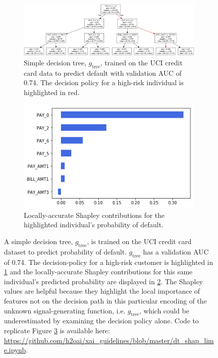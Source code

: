 \documentclass[sigconf]{acmart}
\begin{document}
\begin{figure}[htb!]
	\begin{subfigure}{.55\textwidth}
		\includegraphics[height=.45\linewidth, width=1.15\linewidth]{img/dt.png}
  		\caption{Simple decision tree, $g_{\text{tree}}$, trained on the UCI credit card data to predict default with validation AUC of 0.74. The decision policy for a high-risk individual is highlighted in red.}
  		\label{fig:dt}
	\end{subfigure}\hspace*{40pt}
	\vspace{25pt}\begin{subfigure}{.45\textwidth}
  		\includegraphics[height=.5\linewidth, width=.8\linewidth]{img/shap.png}
		\caption{Locally-accurate Shapley contributions for the\\ highlighted individual's probability of default.}
  		\label{fig:shap}
	\end{subfigure}\vspace{-30pt}
	\caption{A simple decision tree, $g_{\text{tree}}$, is trained on the UCI credit card dataset to predict probability of default. $g_{\text{tree}}$ has a validation AUC of 0.74. The decision-policy for a high-risk customer is highlighted in \ref{fig:dt} and the locally-accurate Shapley contributions for this same individual's predicted probability are displayed in \ref{fig:shap}. The Shapley values are helpful because they highlight the local importance of features not on the decision path in this particular encoding of the unknown signal-generating function, i.e. $g_{\text{tree}}$, which could be underestimated by examining the decision policy alone. Code to replicate Figure \ref{fig:dt_shap} is available here: \url{https://github.com/h2oai/xai_guidelines/blob/master/dt_shap_lime.ipynb}.} 
	\label{fig:dt_shap}
\end{figure}
\end{document}
